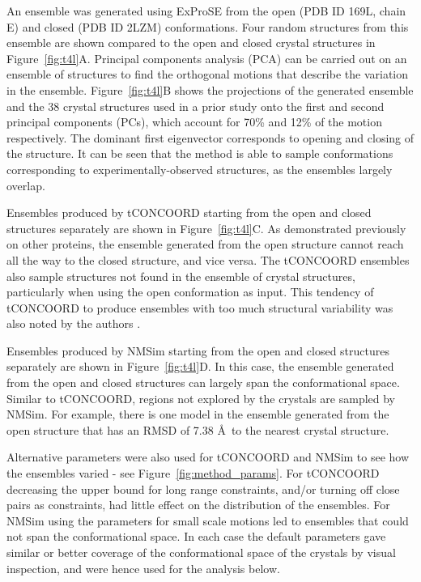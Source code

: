 An ensemble was generated using ExProSE from the open (PDB ID 169L, chain E) and closed (PDB ID 2LZM) conformations.
Four random structures from this ensemble are shown compared to the open and closed crystal structures in Figure~\ref{fig:t4l}A.
Principal components analysis (PCA) can be carried out on an ensemble of structures to find the orthogonal motions that describe the variation in the ensemble.
Figure~\ref{fig:t4l}B shows the projections of the generated ensemble and the 38 crystal structures used in a prior study \cite{DeGroot1998} onto the first and second principal components (PCs), which account for 70\% and 12\% of the motion respectively.
The dominant first eigenvector corresponds to opening and closing of the structure.
It can be seen that the method is able to sample conformations corresponding to experimentally-observed structures, as the ensembles largely overlap.

Ensembles produced by tCONCOORD starting from the open and closed structures separately are shown in Figure~\ref{fig:t4l}C.
As demonstrated previously on other proteins, the ensemble generated from the open structure cannot reach all the way to the closed structure, and vice versa.
The tCONCOORD ensembles also sample structures not found in the ensemble of crystal structures, particularly when using the open conformation as input.
This tendency of tCONCOORD to produce ensembles with too much structural variability was also noted by the authors \cite{Seeliger2009}.

Ensembles produced by NMSim starting from the open and closed structures separately are shown in Figure~\ref{fig:t4l}D.
In this case, the ensemble generated from the open and closed structures can largely span the conformational space.
Similar to tCONCOORD, regions not explored by the crystals are sampled by NMSim.
For example, there is one model in the ensemble generated from the open structure that has an RMSD of 7.38 \AA\ to the nearest crystal structure.

Alternative parameters were also used for tCONCOORD and NMSim to see how the ensembles varied - see Figure~\ref{fig:method_params}.
For tCONCOORD decreasing the upper bound for long range constraints, and/or turning off close pairs as constraints, had little effect on the distribution of the ensembles.
For NMSim using the parameters for small scale motions led to ensembles that could not span the conformational space.
In each case the default parameters gave similar or better coverage of the conformational space of the crystals by visual inspection, and were hence used for the analysis below.


